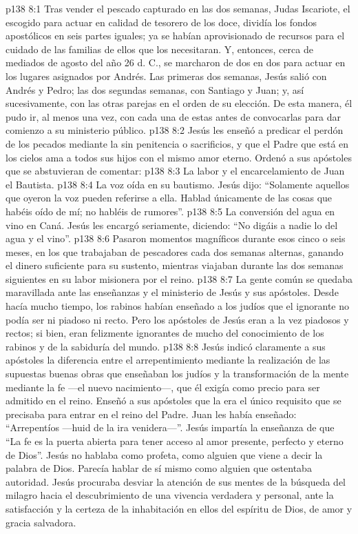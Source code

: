 \vs p138 8:1 Tras vender el pescado capturado en las dos semanas, Judas Iscariote, el escogido para actuar en calidad de tesorero de los doce, dividía los fondos apostólicos en seis partes iguales; ya se habían aprovisionado de recursos para el cuidado de las familias de ellos que los necesitaran. Y, entonces, cerca de mediados de agosto del año 26 d. C., se marcharon de dos en dos para actuar en los lugares asignados por Andrés. Las primeras dos semanas, Jesús salió con Andrés y Pedro; las dos segundas semanas, con Santiago y Juan; y, así sucesivamente, con las otras parejas en el orden de su elección. De esta manera, él pudo ir, al menos una vez, con cada una de estas antes de convocarlas para dar comienzo a su ministerio público.
\vs p138 8:2 Jesús les enseñó a predicar el perdón de los pecados mediante la  sin penitencia o sacrificios, y que el Padre que está en los cielos ama a todos sus hijos con el mismo amor eterno. Ordenó a sus apóstoles que se abstuvieran de comentar:
\vs p138 8:3 La labor y el encarcelamiento de Juan el Bautista.
\vs p138 8:4 La voz oída en su bautismo. Jesús dijo: “Solamente aquellos que oyeron la voz pueden referirse a ella. Hablad únicamente de las cosas que habéis oído de mí; no habléis de rumores”.
\vs p138 8:5 La conversión del agua en vino en Caná. Jesús les encargó seriamente, diciendo: “No digáis a nadie lo del agua y el vino”.
\vs p138 8:6 \pc Pasaron momentos magníficos durante esos cinco o seis meses, en los que trabajaban de pescadores cada dos semanas alternas, ganando el dinero suficiente para su sustento, mientras viajaban durante las dos semanas siguientes en su labor misionera por el reino.
\vs p138 8:7 La gente común se quedaba maravillada ante las enseñanzas y el ministerio de Jesús y sus apóstoles. Desde hacía mucho tiempo, los rabinos habían enseñado a los judíos que el ignorante no podía ser ni piadoso ni recto. Pero los apóstoles de Jesús eran a la vez piadosos y rectos; si bien, eran felizmente ignorantes de mucho del conocimiento de los rabinos y de la sabiduría del mundo.
\vs p138 8:8 \pc Jesús indicó claramente a sus apóstoles la diferencia entre el arrepentimiento mediante la realización de las supuestas buenas obras que enseñaban los judíos y la transformación de la mente mediante la fe ---el nuevo nacimiento---, que él exigía como precio para ser admitido en el reino. Enseñó a sus apóstoles que la  era el único requisito que se precisaba para entrar en el reino del Padre. Juan les había enseñado: “Arrepentíos ---huid de la ira venidera---”. Jesús impartía la enseñanza de que “La fe es la puerta abierta para tener acceso al amor presente, perfecto y eterno de Dios”. Jesús no hablaba como profeta, como alguien que viene a decir la palabra de Dios. Parecía hablar de sí mismo como alguien que ostentaba autoridad. Jesús procuraba desviar la atención de sus mentes de la búsqueda del milagro hacia el descubrimiento de una vivencia verdadera y personal, ante la satisfacción y la certeza de la inhabitación en ellos del espíritu de Dios, de amor y gracia salvadora.

